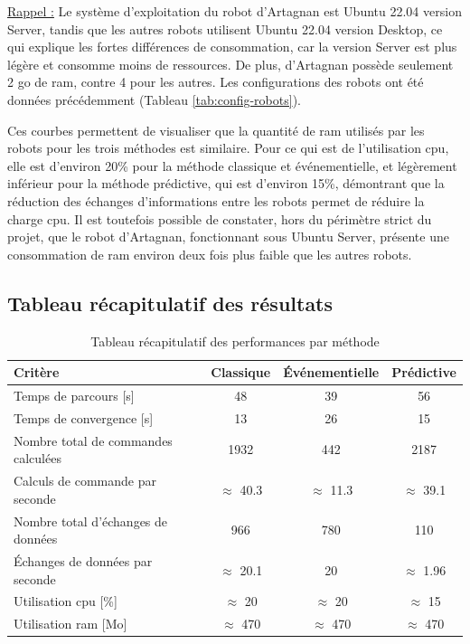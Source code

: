 \noindent \underline{Rappel :} Le système d'exploitation du robot d'Artagnan est Ubuntu 22.04 version Server, tandis que les autres robots utilisent Ubuntu 22.04 version Desktop, ce qui explique les fortes différences de consommation, car la version Server est plus légère et consomme moins de ressources. De plus, d'Artagnan possède seulement 2 \gls{go} de \gls{ram}, contre 4 pour les autres. Les configurations des robots ont été données précédemment (Tableau \ref{tab:config-robots}).

Ces courbes permettent de visualiser que la quantité de \gls{ram} utilisés par les robots pour les trois méthodes est similaire. Pour ce qui est de l'utilisation \gls{cpu}, elle est d'environ 20\% pour la méthode classique et événementielle, et légèrement inférieur pour la méthode prédictive, qui est d'environ 15\%, démontrant que la réduction des échanges d'informations entre les robots permet de réduire la charge \gls{cpu}.
Il est toutefois possible de constater, hors du périmètre strict du projet, que le robot d'Artagnan, fonctionnant sous Ubuntu Server, présente une consommation de \gls{ram} environ deux fois plus faible que les autres robots.

\subsection{Tableau récapitulatif des résultats }

\begin{table}[H]
    \centering
    \caption{Tableau récapitulatif des performances par méthode}
    \label{tab:recap-perf}
    \begin{tabular}{|l|c|c|c|}
        \hline
        Critère & Classique & Événementielle & Prédictive \\
        \hline
        Temps de parcours [s] & 48 & 39 & 56 \\
        Temps de convergence [s] & 13 & 26 & 15 \\
        \hline
        Nombre total de commandes calculées  & 1932 & 442 & 2187 \\
        Calculs de commande par seconde & $\approx$ 40.3 & $\approx$ 11.3 & $\approx$ 39.1 \\
        \hline
        Nombre total d'échanges de données  & 966 & 780 & 110 \\
        Échanges de données par seconde & $\approx$ 20.1 & 20 & $\approx$ 1.96 \\
        \hline
        Utilisation \gls{cpu} [\%] & $\approx$ 20 & $\approx$ 20 & $\approx$ 15 \\
        Utilisation \gls{ram} [Mo] & $\approx$ 470 & $\approx$ 470 & $\approx$ 470 \\
        \hline
    \end{tabular}
\end{table}

